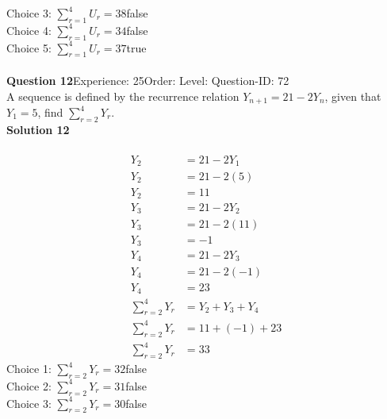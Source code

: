 \documentclass{article}
\begin{document}
Choice 3: \hspace{20pt}$\displaystyle\sum_{r=1}^{4} U_r=38$\hspace{20pt}false\\
Choice 4: \hspace{20pt}$\displaystyle\sum_{r=1}^{4} U_r=34$\hspace{20pt}false\\
Choice 5: \hspace{20pt}$\displaystyle\sum_{r=1}^{4} U_r=37$\hspace{20pt}true\\
\\[4pt]
\noindent\textbf{Question 12}\hspace{20pt}Experience: 25\hspace{20pt}Order: \hspace{20pt}Level: \hspace{20pt}Question-ID: 72\\[2pt]
A sequence is defined by the recurrence relation $Y_{n+1}=21-2Y_n$, given that  $Y_1 =5$, find $\displaystyle\sum_{r=2}^{4} Y_r$.\\[4pt]
\noindent\textbf{Solution 12}\\[2pt]
\\[-35pt]\begin{align*}
Y_2&=21-2Y_1\\[2pt]
Y_2&=21-2(5)\\[2pt]
Y_2&=11\\[12pt]
Y_3&=21-2Y_2\\[2pt]
Y_3&=21-2(11)\\[2pt]
Y_3&=-1\\[12pt]
Y_4&=21-2Y_3\\[2pt]
Y_4&=21-2(-1)\\[2pt]
Y_4&=23\\[12pt]
\displaystyle\sum_{r=2}^{4} Y_r&=Y_2+Y_3+Y_4\\[2pt]
\displaystyle\sum_{r=2}^{4} Y_r&=11+(-1)+23\\[2pt]
\displaystyle\sum_{r=2}^{4} Y_r&=33
\end{align*}
Choice 1: \hspace{20pt}$\displaystyle\sum_{r=2}^{4} Y_r=32$\hspace{20pt}false\\
Choice 2: \hspace{20pt}$\displaystyle\sum_{r=2}^{4} Y_r=31$\hspace{20pt}false\\
Choice 3: \hspace{20pt}$\displaystyle\sum_{r=2}^{4} Y_r=30$\hspace{20pt}false\\
\end{document}
